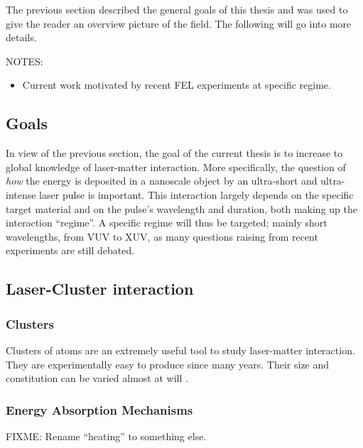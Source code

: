 
The previous section described the general goals of this thesis and was used to
give the reader an overview picture of the field. The following will go
into more details.

NOTES:
\begin{itemize}
\item Current work motivated by recent FEL experiments at specific regime.
\end{itemize}


\subsection{Goals}
In view of the previous section, the goal of the current thesis is to increase
to global knowledge of laser-matter interaction. More specifically, the
question of \textit{how} the energy is deposited in a nanoscale object by an
ultra-short and ultra-intense laser pulse is important. This interaction
largely depends on the specific target material and on the pulse's wavelength
and duration, both making up the interaction ``regime''. A specific regime will
thus be targeted; mainly short wavelengths, from VUV to XUV, as many questions
raising from recent experiments are still debated.

\cite{Young2010,Chapman2011}

\subsection{Laser-Cluster interaction}
\cite{Reinhard2004}


\subsubsection{Clusters}
\label{section:intro:clusters:clusters}

Clusters of atoms are an extremely useful tool to study laser-matter
interaction. They are experimentally easy to produce since many
years\cite{Haberland1994}. Their size and constitution can be varied almost at
will \cite{Martin1996}.

\cite{Fennel2010}

\subsubsection{Energy Absorption Mechanisms}
\label{section:intro:clusters:heating}
FIXME: Rename ``heating'' to something else.


